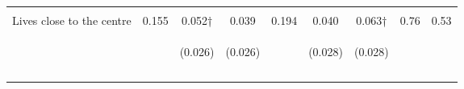 \begin{tabular}{lcccccccc}
 & \begin{footnotesize}\end{footnotesize} & \begin{footnotesize}[0.017]\end{footnotesize} & \begin{footnotesize}[0.016]\end{footnotesize} & \begin{footnotesize}\end{footnotesize} & \begin{footnotesize}[0.505]\end{footnotesize} & \begin{footnotesize}[0.927]\end{footnotesize} & \begin{footnotesize}\end{footnotesize} & \begin{footnotesize}\end{footnotesize}\\
\noalign{\smallskip}Lives close to the centre & 0.155 & 0.052† & 0.039 & 0.194 & 0.040 & 0.063† & 0.76 & 0.53\\
 & \begin{footnotesize}\end{footnotesize} & \begin{footnotesize}(0.026)\end{footnotesize} & \begin{footnotesize}(0.026)\end{footnotesize} & \begin{footnotesize}\end{footnotesize} & \begin{footnotesize}(0.028)\end{footnotesize} & \begin{footnotesize}(0.028)\end{footnotesize} & \begin{footnotesize}\end{footnotesize} & \begin{footnotesize}\end{footnotesize}\\
 & \begin{footnotesize}\end{footnotesize} & \begin{footnotesize}[0.027]\end{footnotesize} & \begin{footnotesize}[0.034]\end{footnotesize} & \begin{footnotesize}\end{footnotesize} & \begin{footnotesize}[0.505]\end{footnotesize} & \begin{footnotesize}[0.136]\end{footnotesize} & \begin{footnotesize}\end{footnotesize} & \begin{footnotesize}\end{footnotesize}\\
\noalign{\smallskip}\hline\end{tabular}\\
